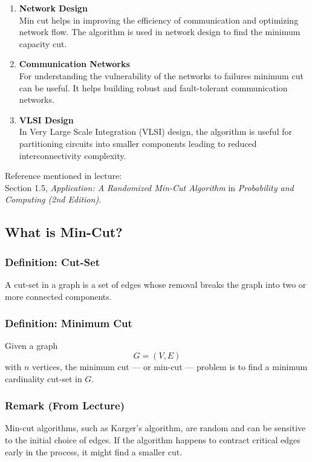 \documentclass[12pt]{article}
\begin{document}
\begin{enumerate}
\item \textbf{Network Design} \\
Min cut helps in improving the efficiency of communication and optimizing network flow. The algorithm is used in network design to find the minimum capacity cut.

\item \textbf{Communication Networks} \\
For understanding the vulnerability of the networks to failures minimum cut can be useful. It helps building robust and fault-tolerant communication networks.

\item \textbf{VLSI Design} \\
In Very Large Scale Integration (VLSI) design, the algorithm is useful for partitioning circuits into smaller components leading to reduced interconnectivity complexity.
\end{enumerate}

Reference mentioned in lecture: \\
Section 1.5, \textit{Application: A Randomized Min-Cut Algorithm} in \textit{Probability and Computing (2nd Edition)}.

\subsection{What is Min-Cut?}

\subsubsection*{Definition: Cut-Set}

A cut-set in a graph is a set of edges whose removal breaks the graph into two or more connected components.

\subsubsection*{Definition: Minimum Cut}

Given a graph
\[
G = (V, E)
\]
with \( n \) vertices, the minimum cut --- or min-cut --- problem is to find a minimum cardinality cut-set in \( G \).

\subsubsection*{Remark (From Lecture)}

Min-cut algorithms, such as Karger’s algorithm, are random and can be sensitive to the initial choice of edges. If the algorithm happens to contract critical edges early in the process, it might find a smaller cut.
\end{document}
